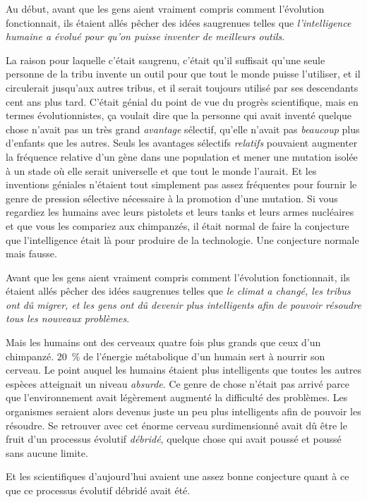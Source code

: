 Au début, avant que les gens aient vraiment compris comment l'évolution fonctionnait, ils étaient allés pêcher des idées saugrenues telles que \emph{l'intelligence humaine a évolué pour qu'on puisse inventer de meilleurs outils}.

La raison pour laquelle c'était saugrenu, c'était qu'il suffisait qu'une seule personne de la tribu invente un outil pour que tout le monde puisse l'utiliser, et il circulerait jusqu'aux autres tribus, et il serait toujours utilisé par ses descendants cent ans plus tard. C'était génial du point de vue du progrès scientifique, mais en termes évolutionnistes, ça voulait dire que la personne qui avait inventé quelque chose n'avait pas un très grand \emph{avantage} sélectif, qu'elle n'avait pas \emph{beaucoup} plus d'enfants que les autres. Seuls les avantages sélectifs \emph{relatifs} pouvaient augmenter la fréquence relative d'un gène dans une population et mener une mutation isolée à un stade où elle serait universelle et que tout le monde l'aurait. Et les inventions géniales n'étaient tout simplement pas assez fréquentes pour fournir le genre de pression sélective nécessaire à la promotion d'une mutation. Si vous regardiez les humains avec leurs pistolets et leurs tanks et leurs armes nucléaires et que vous les compariez aux chimpanzés, il était normal de faire la conjecture que l'intelligence était là pour produire de la technologie. Une conjecture normale mais fausse.

Avant que les gens aient vraiment compris comment l'évolution fonctionnait, ils étaient allés pêcher des idées saugrenues telles que \emph{le climat a changé, les tribus ont dû migrer, et les gens ont dû devenir plus intelligents afin de pouvoir résoudre tous les nouveaux problèmes}.

Mais les humains ont des cerveaux quatre fois plus grands que ceux d'un chimpanzé. 20~\% de l'énergie métabolique d'un humain sert à nourrir son cerveau. Le point auquel les humains étaient plus intelligents que toutes les autres espèces atteignait un niveau \emph{absurde}. Ce genre de chose n'était pas arrivé parce que l'environnement avait légèrement augmenté la difficulté des problèmes. Les organismes seraient alors devenus juste un peu plus intelligents afin de pouvoir les résoudre. Se retrouver avec cet énorme cerveau surdimensionné avait dû être le fruit d'un processus évolutif \emph{débridé}, quelque chose qui avait poussé et poussé sans aucune limite.

Et les scientifiques d'aujourd'hui avaient une assez bonne conjecture quant à ce que ce processus évolutif débridé avait été.

